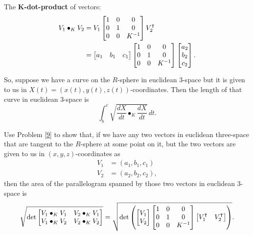 \documentclass{ximera}
\begin{document}
\begin{definition}
The \textbf{$\boldsymbol{K}$-dot-product} of vectors:%
\begin{align}
V_{1}\bullet_{K}V_{2}  &=V_{1} 
\begin{bmatrix}
1 & 0 & 0\\
0 & 1 & 0\\
0 & 0 & K^{-1}%
\end{bmatrix}
V_{2}^\transpose\label{10}\\
&=
\begin{bmatrix}
a_{1} & b_{1} & c_{1}%
\end{bmatrix}
\begin{bmatrix}
1 & 0 & 0\\
0 & 1 & 0\\
0 & 0 & K^{-1}%
\end{bmatrix}
\begin{bmatrix}
a_{2}\\
b_{2}\\
c_{2}%
\end{bmatrix}.
\end{align}

\end{definition}

So, suppose we have a curve on the $R$-sphere in euclidean $3$-space
but it is given to us in $X(t)=(x(t),y(t),z(t))$-coordinates. Then the
length of that curve in euclidean $3$-space is
\[
\int_{b}^{e}\sqrt{\frac{dX}{dt}\bullet_{K}\frac{dX}{dt}}\,dt.
\]


\begin{problem}
\label{222}Use Problem \ref{9} to show that, if we have any two vectors in
euclidean three-space that are tangent to the $R$-sphere at some point on it,
but the two vectors are given to us in $(x,y,z)$-coordinates as%
\begin{align*}
V_{1}  &  =\left(  a_{1},b_{1},c_{1}\right) \\
V_{2}  &  =\left(  a_{2},b_{2},c_{2}\right)  ,
\end{align*}
then the area of the parallelogram spanned by those two vectors in euclidean
$3$-space is%
\[
\sqrt{\det
\begin{bmatrix}
V_{1}\bullet_{K}V_{1} & V_{2}\bullet_{K}V_{1}\\
V_{1}\bullet_{K}V_{2} & V_{2}\bullet_{K}V_{2}%
\end{bmatrix}}
=\sqrt{\det\left( 
\begin{bmatrix}
V_{1} \\
V_{2}
\end{bmatrix}
\begin{bmatrix}
1 & 0 & 0\\
0 & 1 & 0\\
0 & 0 & K^{-1}%
\end{bmatrix}
\begin{bmatrix}
V_{1}^\transpose & V_{2}^\transpose%
\end{bmatrix}
\right) }.
\]

\end{problem}
\end{document}
